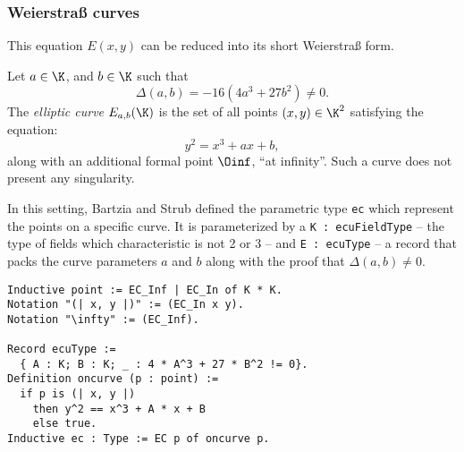 \subsubsection{Weierstra{\ss} curves}
\label{subsec:ECC-Weierstrass}

This equation $E(x,y)$ can be reduced into its short Weierstra{\ss} form.

\begin{dfn}
Let $a \in \K$, and $b \in \K$ such that $$\Delta(a,b) = -16(4a^3 + 27b^2) \neq 0.$$
The \textit{elliptic curve} $E_{a,b}(\K)$ is the set of all points $(x,y) \in \K^2$ satisfying the equation:
$$y^2 = x^3 + ax + b,$$
along with an additional formal point $\Oinf$, ``at infinity''. Such a curve does not present any singularity.
\end{dfn}

In this setting, Bartzia and Strub defined the parametric type \texttt{ec} which
represent the points on a specific curve. It is parameterized by
a \texttt{K : ecuFieldType} -- the type of fields which characteristic is not 2 or 3 --
and \texttt{E : ecuType} -- a record that packs the curve parameters $a$ and $b$
along with the proof that $\Delta(a,b) \neq 0$.
\begin{lstlisting}[language=Coq]
Inductive point := EC_Inf | EC_In of K * K.
Notation "(| x, y |)" := (EC_In x y).
Notation "\infty" := (EC_Inf).

Record ecuType :=
  { A : K; B : K; _ : 4 * A^3 + 27 * B^2 != 0}.
Definition oncurve (p : point) :=
  if p is (| x, y |)
    then y^2 == x^3 + A * x + B
    else true.
Inductive ec : Type := EC p of oncurve p.
\end{lstlisting}

